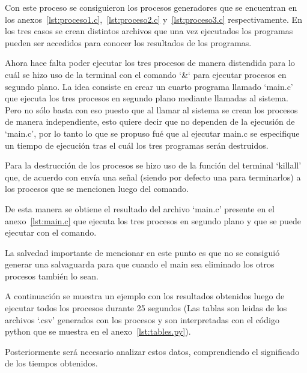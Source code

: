 Con este proceso se consiguieron los procesos generadores que se encuentran en los anexos~\ref{lst:proceso1.c},~\ref{lst:proceso2.c} y~\ref{lst:proceso3.c} respectivamente. En los tres casos se crean distintos archivos que una vez ejecutados los programas pueden ser accedidos para conocer los resultados de los programas.

Ahora hace falta poder ejecutar los tres procesos de manera distendida para lo cuál se hizo uso de la terminal con el comando `\&` para ejecutar procesos en segundo plano. La idea consiste en crear un cuarto programa llamado `main.c' que ejecuta los tres procesos en segundo plano mediante llamadas al sistema. Pero no sólo basta con eso puesto que al llamar al sistema se crean los procesos de manera independiente, esto quiere decir que no dependen de la ejecusión de `main.c', por lo tanto lo que se propuso fué que al ejecutar main.c se especifique un tiempo de ejecución tras el cuál los tres programas serán destruidos.

Para la destrucción de los procesos se hizo uso de la función del terminal `killall' que, de acuerdo con \textcite{kilall} envía una señal (siendo por defecto una para terminarlos) a los procesos que se mencionen luego del comando.

De esta manera se obtiene el resultado del archivo `main.c' presente en el anexo~\ref{lst:main.c} que ejecuta los tres procesos en segundo plano y que se puede ejecutar con el comando.

La salvedad importante de mencionar en este punto es que no se consiguió generar una salvaguarda para que cuando el main sea eliminado los otros procesos también lo sean.

A continuación se muestra un ejemplo con los resultados obtenidos luego de ejecutar todos los procesos durante 25 segundos (Las tablas son leidas de los archivos `.csv' generados con los procesos y son interpretadas con el código python que se muestra en el anexo~\ref{lst:tables.py}).


\newpage

\newpage

Posteriormente será necesario analizar estos datos, comprendiendo el significado de los tiempos obtenidos.